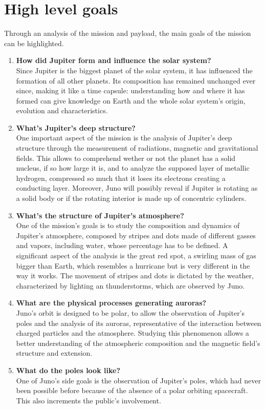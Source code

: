 \section{High level goals}
\label{sec:goals}

Through an analysis of the mission and payload, the main goals of the mission can be highlighted. \\


\begin{enumerate}
    \item \textbf{How did Jupiter form and influence the solar system? }\\
    Since Jupiter is the biggest planet of the solar system, it has influenced the formation of all other planets. Its composition has remained unchanged ever since, making it like a time capsule: understanding how and where it has formed can give knowledge on Earth and the whole solar system’s origin, evolution and characteristics. 
    \item \textbf{What's Jupiter's deep structure?}\\
    One important aspect of the mission is the analysis of Jupiter's deep structure through the measurement of radiations, magnetic and gravitational fields. This allows to comprehend wether or not the planet has a solid nucleus, if so how large it is, and to analyze the supposed layer of metallic hydrogen, compressed so much that it loses its electrons creating a conducting layer.  Moreover, Juno will possibly reveal if Jupiter is rotating as a solid body or if the rotating interior is made up of concentric cylinders.
    \item \textbf{What's the structure of Jupiter's atmosphere?}\\
    One of the mission's goals is to study the composition and dynamics of Jupiter's atmosphere, composed by stripes and dots made of different gasses and vapors, including water, whose percentage has to be defined. A significant aspect of the analysis is the great red spot, a swirling mass of gas bigger than Earth, which resembles a hurricane but is very different in the way it works. The movement of stripes and dots is dictated by the weather, characterized by lighting an thunderstorms, which are observed by Juno. 
    \item \textbf{What are the physical processes generating auroras?}\\
    Juno's orbit is designed to be polar, to allow the observation of Jupiter's poles and the analysis of its auroras, representative of the interaction between charged particles and the atmosphere. Studying this phenomenon allows a better understanding of the atmospheric composition and the magnetic field's structure and extension.
    \item \textbf{What do the poles look like? }\\
    One of Juno's side goals is the observation of Jupiter's poles, which had never been possible before because of the absence of a polar orbiting spacecraft. This also increments the public's involvement.

   





\end{enumerate}